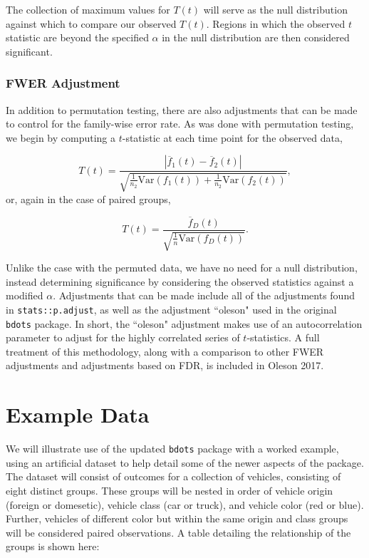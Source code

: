 \documentclass{article}
\newcommand{\xt}{\texttt}%
\begin{document}
The collection of maximum values for $T(t)$ will serve as the null distribution against which to compare our observed $T(t)$. Regions in which the observed $t$ statistic are beyond the specified $\alpha$ in the null distribution are then considered significant.


\subsubsection{FWER Adjustment}

In addition to permutation testing, there are also adjustments that can be made to control for the family-wise error rate. As was done with permutation testing, we begin by computing a $t$-statistic at each time point for the observed data, 

\begin{equation}
T(t) = \frac{|\overline{f}_1(t) - \overline{f}_2(t)|}{\sqrt{\frac{1}{n_2} \text{Var}(f_1(t)) + \frac{1}{n_2} \text{Var}(f_2(t))}}, 
\end{equation}
or, again in the case of paired groups, 

\begin{equation}
T(t) = \frac{\overline{f}_D(t)}{\sqrt{\frac1n \text{Var}(f_D(t))}}.
\end{equation}

Unlike the case with the permuted data, we have no need for a null distribution, instead determining significance by considering the observed statistics against a modified $\alpha$.  Adjustments that can be made include all of the adjustments found in \xt{stats::p.adjust}, as well as the adjustment ``oleson" used in the original \xt{bdots} package. In short, the ``oleson" adjustment makes use of an autocorrelation parameter to adjust for the highly correlated series of $t$-statistics. A full treatment of this methodology, along with a comparison to other FWER adjustments and adjustments based on FDR, is included in Oleson 2017.


\section{Example Data}

We will illustrate use of the updated \xt{bdots} package with a worked example, using an artificial dataset to help detail some of the newer aspects of the package. The dataset will consist of outcomes for a collection of vehicles, consisting of eight distinct groups. These groups will be nested in order of vehicle origin (foreign or domesetic), vehicle class (car or truck), and vehicle color (red or blue). Further, vehicles of different color but within the same origin and class groups will be considered paired observations. A table detailing the relationship of the groups is shown here:
\end{document}

